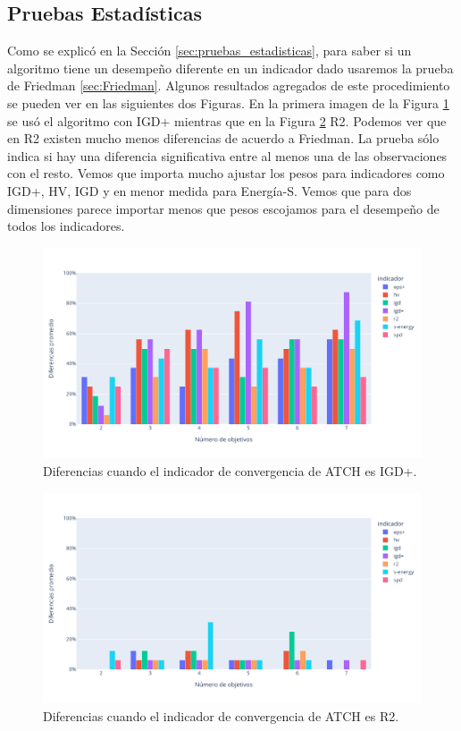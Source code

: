 \subsection{Pruebas Estadísticas}

Como se explicó en la Sección \ref{sec:pruebas_estadisticas}, para saber si un algoritmo tiene un desempeño diferente en un indicador dado usaremos la prueba de Friedman \ref{sec:Friedman}. Algunos resultados agregados de este procedimiento se pueden ver en las siguientes dos Figuras. En la primera imagen de la Figura \ref{fig:Fr_dim_IGDp} se usó el algoritmo con IGD+ mientras que en la Figura \ref{fig:Fr_dim_R2} R2. Podemos ver que en R2 existen mucho menos diferencias de acuerdo a Friedman.   La prueba sólo indica si hay una diferencia significativa entre al menos una de las observaciones con el resto. Vemos que importa mucho ajustar los pesos para indicadores como IGD+, HV, IGD y en menor medida para Energía-S. Vemos que para dos dimensiones parece importar menos que pesos escojamos para el desempeño de todos los indicadores.

\begin{figure}[H]
    \centering
    \includegraphics[width=\textwidth]{Figuras/Friedman_obj_indconv_IGD+.pdf}
    \caption[Friedman IGD+]{Diferencias cuando el indicador de convergencia de ATCH es IGD+.}
    \label{fig:Fr_dim_IGDp}
\end{figure}

\begin{figure}[H]
    \centering
    \includegraphics[width=\textwidth]{Figuras/Friedman_obj_indconv_R2.pdf}
    \caption[Friedman R2]{Diferencias cuando el indicador de convergencia de ATCH es R2.}
    \label{fig:Fr_dim_R2}
\end{figure}


